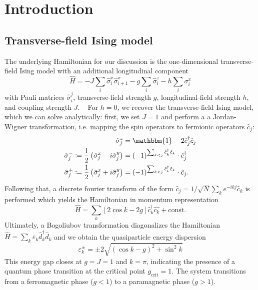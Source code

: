 \section{Introduction}
\subsection{Transverse-field Ising model}
The underlying Hamiltonian for our discussion is the one-dimensional transverse-field Ising model with an additional longitudinal component
\begin{equation}
    \label{eq:TFI}
    \hat{H} = -J \sum_{i} \hat{\sigma}^x_i \hat{\sigma}^x_{i+1} - g \sum_i \hat{\sigma}^z_i - h \sum_i \sigma_i^x
\end{equation}
with Pauli matrices $\hat{\sigma}_i^j$, transverse-field strength $g$, longitudinal-field strength $h$, and coupling strength $J$. ~\cite{labmanual}
For $h = 0$, we recover the transverse-field Ising model, which we can solve analytically:
first, we set $J=1$ and perform a a Jordan-Wigner transformation, i.e.
mapping the spin operators to fermionic operators $\hat{c}_j$:
\begin{align*}
    \hat{\sigma}_j^z &= \mathbbm{1} - 2\hat{c}_j^\dagger \hat{c}_j \\
    \hat{\sigma}_j^- \coloneqq \frac{1}{2} \left( \hat{\sigma}_j^x - i \hat{\sigma}_j^y\right) 
    &= \left( - 1\right)^{\sum_{k < j} \hat{c}_k^\dagger \hat{c}_k} \cdot \hat{c}_j^\dagger \\ 
    \hat{\sigma}_j^+ \coloneqq \frac{1}{2} \left( \hat{\sigma}_j^x + i \hat{\sigma}_j^y\right) 
    &= \left( - 1\right)^{\sum_{k < j} \hat{c}_k^\dagger \hat{c}_k} \cdot \hat{c}_j.
\end{align*}
Following that, a discrete fourier transform of the form $\hat{c}_j = 1/\sqrt{N}\sum_k e^{-ikj} \hat{c}_k$ is performed
which yields the Hamiltonian in momentum representation 
\begin{equation*}
 \hat{H} = \sum_k [ 2 \cos k - 2 g ] \hat{c}_k^\dagger \hat{c_k} + \text{const}.
\end{equation*}
Ultimately, a Bogoliubov transformation diagonalizes the Hamiltonian $\hat{H} = 
\sum_k \varepsilon_k \hat{d}_k^\dagger \hat{d}_k$ and we obtain the quasiparticle
energy dispersion 
\begin{equation}
    \label{eq:dispersion}
    \varepsilon_k^\pm = \pm  2 \sqrt{(\cos k - g)^2 + \sin^2 k}
\end{equation}
This energy gap closes at $g = J = 1$ and $k = \pi$, indicating the presence
of a quantum phase transition at the critical point $g_\text{crit} = 1$. 
The system transitions from a ferromagnetic phase ($g < 1$) to a paramagnetic phase ($g > 1$). ~\cite{dutta2015,Coleman_2015}

